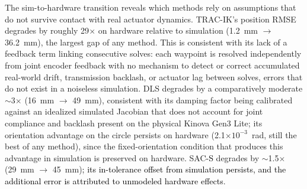\documentclass[preprint,12pt]{elsarticle}
\begin{document}

The sim-to-hardware transition reveals which methods rely on assumptions
that do not survive contact with real actuator dynamics. TRAC-IK's
position RMSE degrades by roughly 29$\times$ on hardware relative to
simulation (1.2~mm $\rightarrow$ 36.2~mm), the largest gap of any method.
This is consistent with its lack of a feedback term linking consecutive solves: each waypoint is resolved independently from joint
encoder feedback with no mechanism to detect or correct accumulated
real-world drift, transmission backlash, or actuator lag between
solves, errors that do not exist in a noiseless simulation. DLS degrades
by a comparatively moderate $\sim$3$\times$ (16~mm $\rightarrow$ 49~mm),
consistent with its damping factor being calibrated against an idealized
simulated Jacobian that does not account for joint compliance and
backlash present on the physical Kinova Gen3 Lite; its orientation
advantage on the circle persists on hardware (2.1$\times10^{-3}$~rad,
still the best of any method), since the fixed-orientation condition that
produces this advantage in simulation is preserved on hardware. SAC\textcolor{black}{-S}
degrades by $\sim$1.5$\times$ (29~mm $\rightarrow$ 45~mm)\textcolor{black}{; its in-tolerance offset from simulation persists, and the additional error is attributed to unmodeled hardware effects}.
\end{document}
